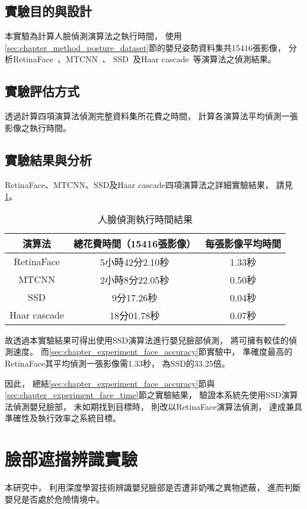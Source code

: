 \documentclass[class=NCU_thesis, crop=false]{standalone}
\begin{document}
\subsection{實驗目的與設計}
本實驗為計算人臉偵測演算法之執行時間，
使用\ref{sec:chapter_method_posture_dataset}節的嬰兒姿勢資料集共15416張影像，
分析RetinaFace~\cite{deng_retinaface_2020}、MTCNN~\cite{zhang_joint_2016}、
SSD~\cite{ye_face_2021}及Haar cascade~\cite{goyal_face_2017}等演算法之偵測結果。

\subsection{實驗評估方式}
透過計算四項演算法偵測完整資料集所花費之時間，
計算各演算法平均偵測一張影像之執行時間。

\subsection{實驗結果與分析}
RetinaFace、MTCNN、SSD及Haar cascade四項演算法之詳細實驗結果，
請見\cref{table:table-face-detection-time}。
\begin{table}[h]
    \centering
    \caption{人臉偵測執行時間結果}
    \label{table:table-face-detection-time}
    \begin{tabular}{ccc}
    \hline
    演算法 & 總花費時間（15416張影像） & 每張影像平均時間 \\
    \hline
    RetinaFace & 5小時42分2.10秒 & 1.33秒 \\
    MTCNN & 2小時8分22.05秒 & 0.50秒 \\
    SSD & 9分17.26秒 & 0.04秒 \\
    Haar cascade & 18分01.78秒 & 0.07秒 \\
    \hline
    \end{tabular}
\end{table}

故透過本實驗結果可得出使用SSD演算法進行嬰兒臉部偵測，
將可擁有較佳的偵測速度。
而\ref{sec:chapter_experiment_face_accuracy}節實驗中，
準確度最高的RetinaFace其平均偵測一張影像需1.33秒，
為SSD的33.25倍。

因此，
總結\ref{sec:chapter_experiment_face_accuracy}節與\ref{sec:chapter_experiment_face_time}節之實驗結果，
驗證本系統先使用SSD演算法偵測嬰兒臉部，
未如期找到目標時，
則改以RetinaFace演算法偵測，
達成兼具準確性及執行效率之系統目標。

\section{臉部遮擋辨識實驗}
本研究中，
利用深度學習技術辨識嬰兒臉部是否遭非奶嘴之異物遮蔽，
進而判斷嬰兒是否處於危險情境中。
\end{document}
